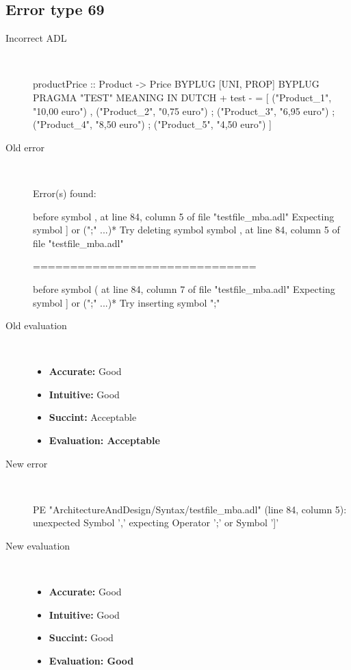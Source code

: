 \hrulefill

\subsection{Error type 69}
  \begin{description}
  \item[Incorrect ADL]~\\
\begin{adl}
productPrice :: Product -> Price BYPLUG [UNI, PROP] BYPLUG PRAGMA "TEST"
MEANING IN DUTCH  {+ test -}
  = [ ("Product_1", "10,00 euro")
    , ("Product_2", "0,75 euro")
    ; ("Product_3", "6,95 euro")
    ; ("Product_4", "8,50 euro")
    ; ("Product_5", "4,50 euro")
    ]\end{adl}
  \item[Old error]~\\
\begin{haskell}
Error(s) found:

before symbol , at line 84, column 5 of file "testfile_mba.adl"
Expecting symbol ] or (";" ...)*
Try deleting symbol symbol , at line 84, column 5 of file "testfile_mba.adl"

==============================

before symbol ( at line 84, column 7 of file "testfile_mba.adl"
Expecting symbol ] or (";" ...)*
Try inserting symbol ";"
\end{haskell}
  \item[Old evaluation]~\\
    \begin{itemize}
    \item \textbf{Accurate:} Good
    \item \textbf{Intuitive:} Good
    \item \textbf{Succint:} Acceptable
    \item \textbf{Evaluation: Acceptable}
    \end{itemize}
  \item[New error]~\\
\begin{haskell}
PE "ArchitectureAndDesign/Syntax/testfile_mba.adl" (line 84, column 5):
unexpected Symbol ','
expecting Operator ';' or Symbol ']'
\end{haskell}
  \item[New evaluation]~\\
    \begin{itemize}
    \item \textbf{Accurate:} Good
    \item \textbf{Intuitive:} Good
    \item \textbf{Succint:} Good
    \item \textbf{Evaluation: Good
}
    \end{itemize}
  \end{description}

